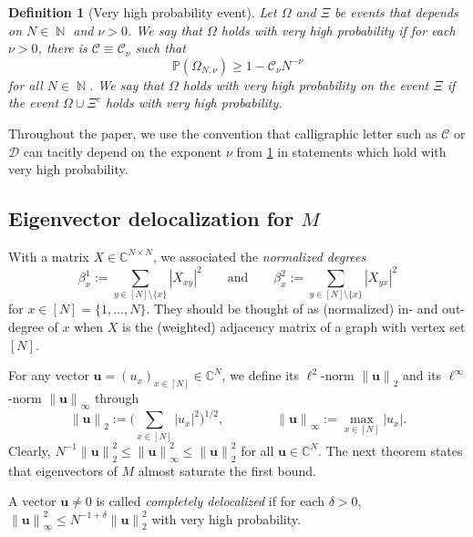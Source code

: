 \documentclass[11pt]{article}
\DeclareMathOperator{\NN}{\mathbb{N}}
\newcommand{\abs}[1]{\left| #1 \right|}
\newcommand{\norm}[1]{\left\| #1 \right\|}
\newcommand{\C}{\mathbb{C}}
\theoremstyle{plain}
\newtheorem{defi}{Definition}[section]
\theoremstyle{remark}
\numberwithin{equation}{section}
\begin{document}
	\begin{defi}[Very high probability event]\label{def:very_high_probab} 
		Let $\Omega$ and $\Xi$ be events that depends on $N \in \NN$ and $\nu >0$. We say that $\Omega$ holds \emph{with very high probability} if for each $\nu>0$, there is $\mathcal C \equiv \mathcal C_\nu$ such that 
		\[ 
		\mathbb{P}(\Omega_{N,\nu}) \geq 1 - \mathcal C_\nu N^{-\nu} 
		\] 
		for all $N \in \NN$.  We say that $\Omega$ holds \textup{with very high probability on the event} $\Xi$ if the event $\Omega \cup \Xi^{c}$ holds with very high probability.
	\end{defi} 
	Throughout the paper, we use the convention that calligraphic letter such as $\mathcal C$ or $\mathcal D$ can tacitly depend on the exponent $\nu$ from \cref{def:very_high_probab} in statements which hold with very high probability. 
	
	\subsection{Eigenvector delocalization for $M$} 
	
	With a matrix $X \in \C^{N\times N}$, we associated the \emph{normalized degrees} 
	\begin{equation}\label{eq:def_beta_i_x} 
		\beta^1_x:= \sum_{y \in [N]\setminus\{x\}} |X_{xy}|^2 \qquad \text{and} \qquad 	\beta^2_x:= \sum_{y\in [N] \setminus \{ x\}} |X_{yx}|^2
	\end{equation}
	for $x \in [N]=\{1, \ldots, N\}$. 
	They should be thought of as (normalized) in- and out-degree of $x$ when $X$ is the (weighted) adjacency matrix of a graph with vertex set $[N]$. 
	
	For any vector $\mathbf u=(u_x)_{x \in [N]} \in \C^N$, we define its $\ell^2$-norm $\norm{\mathbf u}_2$ and its $\ell^\infty$-norm $\norm{\mathbf u}_\infty$ through 
	\begin{equation} \label{eq:def_vector_norms} 
		\norm{\mathbf u}_2 := \biggl(\sum_{x \in [N]} \abs{u_x}^2\biggr)^{1/2}, \qquad \qquad \norm{\mathbf u}_\infty := \max_{x \in [N]} \abs{u_x}. 
	\end{equation} 
	Clearly, $N^{-1} \norm{\mathbf u}_2^2 \leq \norm{\mathbf u}_\infty^2 \leq \norm{\mathbf u}_2^2$ for all $\mathbf u \in \C^N$. 
	The next theorem states that eigenvectors of $M$ almost saturate the first bound. 
	


	 A vector $\mathbf u \neq 0$ is called \emph{completely delocalized} if for each $\delta>0$, $\norm{\mathbf u}^2_\infty \leq N^{-1 + \delta}\norm{\mathbf u}_2^2$ with very high probability. 
	 
\end{document}
